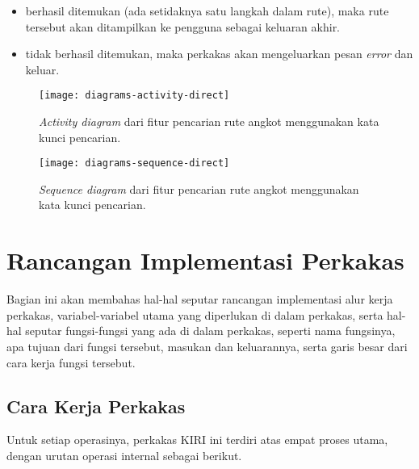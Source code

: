 \begin{enumerate}
	\begin{itemize}
		\item berhasil ditemukan (ada setidaknya satu langkah dalam rute), maka rute tersebut akan ditampilkan ke pengguna sebagai keluaran akhir.
		\item tidak berhasil ditemukan, maka perkakas akan mengeluarkan pesan \textit{error} dan keluar.
	\end{itemize}
	
\end{enumerate}

\begin{figure}[h]
    \centering
    \texttt{[image: diagrams-activity-direct]}
    \caption[\textit{Activity diagram} fitur pencarian rute angkot menggunakan kata kunci lokasi]{\textit{Activity diagram} dari fitur pencarian rute angkot menggunakan kata kunci pencarian.}
    \label{fig:diagrams-activity-direct}
\end{figure}

\begin{figure}[h]
    \centering
    \texttt{[image: diagrams-sequence-direct]}
    \caption[\textit{Sequence diagram} fitur pencarian rute angkot menggunakan kata kunci lokasi]{\textit{Sequence diagram} dari fitur pencarian rute angkot menggunakan kata kunci pencarian.}
    \label{fig:diagrams-sequence-direct}
\end{figure}

\section{Rancangan Implementasi Perkakas}
\label{sec:design-implementation}

Bagian ini akan membahas hal-hal seputar rancangan implementasi alur kerja perkakas, variabel-variabel utama yang diperlukan di dalam perkakas, serta hal-hal seputar fungsi-fungsi yang ada di dalam perkakas, seperti nama fungsinya, apa tujuan dari fungsi tersebut, masukan dan keluarannya, serta garis besar dari cara kerja fungsi tersebut.

\subsection{Cara Kerja Perkakas}
\label{sec:design-implementation-overview}

Untuk setiap operasinya, perkakas \cl KIRI ini terdiri atas empat proses utama, dengan urutan operasi internal sebagai berikut.

